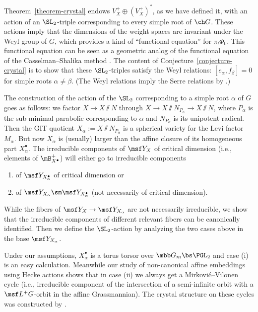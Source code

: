 Theorem~\ref{theorem-crystal} endows $V_X^+ \oplus (V_X^+)^*$, as we have defined it,
with an action of an $\SL_2$-triple corresponding to every simple root of $\ch G$.
These actions imply that the dimensions of the weight spaces
are invariant under the Weyl group of $G$, which provides a kind of
``functional equation'' for $\pi_!\Phi_0$. This functional equation can be seen as a geometric analog of the functional equation of the Casselman--Shalika method \cite{C,CS,SaSph}.
The content of
Conjecture~\ref{conjecture-crystal} is to show that these $\SL_2$-triples satisfy
the Weyl relations: $[e_\alpha, f_\beta]=0$ for simple roots $\alpha\ne \beta$.
(The Weyl relations imply the Serre relations by \cite[Corollary 4.3.2]{Chriss-Ginzburg}.)




The construction of the action of the $\SL_2$ corresponding to a simple root $\alpha$ of $G$
goes as follows:
we factor $X \to X \sslash N$ through $X \to X\sslash N_{P_\alpha} \to X\sslash N$, where $P_\alpha$ is the
sub-minimal parabolic corresponding to $\alpha$ and $N_{P_\alpha}$ is its unipotent radical.
Then the GIT quotient $X_\alpha:= X\sslash N_{P_\alpha}$ is a spherical variety for the Levi factor $M_\alpha$.
But now $X_\alpha$ is (usually) larger than the affine closure of its homogeneous part $X_\alpha^\bullet$.
The irreducible components of $\msf Y_X$ of critical dimension (i.e., elements of $\mB_{X^\bullet}^+$)
will either go to irreducible components
\begin{enumerate}
\item of $\msf Y_{X_\alpha^\bullet}$ of critical dimension or
\item of $\msf Y_{X_\alpha} \sm \msf Y_{X_\alpha^\bullet}$ (not necessarily of critical dimension).
\end{enumerate}
While the fibers of $\msf Y_X \to \msf Y_{X_\alpha}$ are not necessarily irreducible, we
show that the irreducible components of different relevant fibers can be canonically identified.
Then we define the $\SL_2$-action by analyzing the two cases above in the base $\msf Y_{X_\alpha}$.

Under our assumptions, $X_\alpha^\bullet$ is a torus torsor over $\mbb G_m \bs \PGL_2$ and case (i) is an easy
calculation. Meanwhile our study of non-canonical affine embeddings using Hecke actions
shows that in case (ii) we always get a Mirkovi\'c--Vilonen cycle (i.e., irreducible
component of the intersection of a semi-infinite orbit with a $\msf L^+G$-orbit in the affine Grassmannian).
The crystal structure on these cycles was constructed by \cite{BGcrys}.



